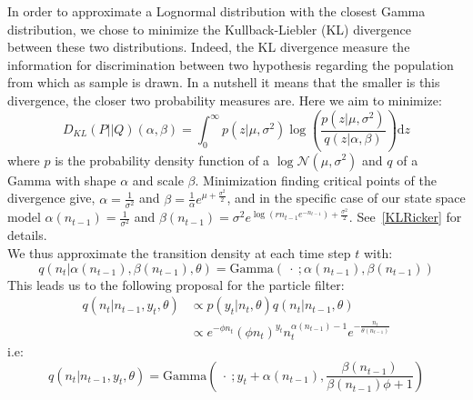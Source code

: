 \documentclass[12pt]{article}
\begin{document}
	In order to approximate a Lognormal distribution with the closest Gamma distribution, we chose to minimize the Kullback-Liebler (KL) divergence~\cite{kullback1951information} between these two distributions. Indeed, the KL divergence measure the information for discrimination between two hypothesis regarding the population from which as sample is drawn. In a nutshell it means that the smaller is this divergence, the closer two probability measures are. Here we aim to minimize:
	\begin{equation}
	D_{KL}(P||Q)(\alpha, \beta) = \int_{0}^{\infty}{p(z|\mu, \sigma^2)\log(\frac{p(z|\mu, \sigma^2)}{q(z|\alpha, \beta)})\mathrm{d}z}
	\end{equation}
	where $p$ is the probability density function of a $\log\mathcal{N}(\mu, \sigma^2)$ and $q$ of a Gamma with shape $\alpha$ and scale $\beta$. Minimization finding critical points of the divergence give, $\alpha =\frac{1}{\sigma^2}$ and $\beta=\frac{1}{\alpha}e^{\mu+\frac{\sigma^2}{2}}$, and in the specific case of our state space model $\alpha(n_{t-1})= \frac{1}{\sigma^2}$ and $\beta(n_{t-1})=\sigma^2e^{\log(rn_{t-1}e^{-n_{t-1}})+\frac{\sigma^2}{2}}$. See~\ref{KLRicker} for details. \\
	We thus approximate the transition density at each time step $t$ with:
	\begin{equation*}
	q(n_t|\alpha(n_{t-1}), \beta(n_{t-1}), \theta) = \mathrm{Gamma}(\ \cdot \ ; \alpha(n_{t-1}), \beta(n_{t-1}) )
	\end{equation*}
	This leads us to the following proposal for the particle filter:
	\begin{equation*}
	\begin{split}
	q(n_t|n_{t-1}, y_t, \theta) & \propto  p(y_t|n_t, \theta)q(n_t|n_{t-1}, \theta) \\
	& \propto e^{-\phi n_t}(\phi n_t)^{y_t}n_t^{\alpha(n_{t-1})-1}e^{-\frac{n_t}{\theta(n_{t-1})}}
	\end{split}
	\end{equation*}
	i.e:
	\begin{equation*}
	q(n_t|n_{t-1}, y_t, \theta) = \mathrm{Gamma}(\ \cdot \ ; y_t+\alpha(n_{t-1}), \frac{\beta(n_{t-1})}{\beta(n_{t-1})\phi + 1})\end{equation*} \\
	
\end{document}

